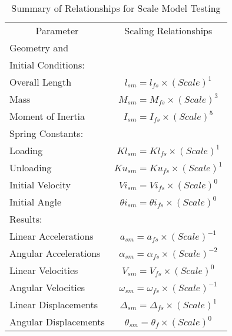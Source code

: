 \begin{table}
\begin{center}
\caption{Summary of Relationships for Scale Model Testing}
\makeqnum
\begin{tabular}{||l|c||}
\hline
\multicolumn{1}{|c}{Parameter}
 &\multicolumn{1}{|c||}{Scaling Relationships}\\
Geometry and & \\
Initial Conditions: &\\
\quad Overall Length     & $l_{sm} = l_{fs} \times (Scale)^{1}$\\
\quad Mass               & $M_{sm} = M_{fs} \times (Scale)^{3}$\\
\quad Moment of Inertia  & $I_{sm} = I_{fs} \times (Scale)^{5}$\\
\quad Spring Constants: &\\
\quad \quad Loading      & $Kl_{sm} = Kl_{fs} \times (Scale)^{1}$\\
\quad \quad Unloading    & $Ku_{sm} = Ku_{fs} \times (Scale)^{1}$\\
\quad Initial Velocity   & $Vi_{sm} = Vi_{fs} \times (Scale)^{0}$\\
\quad Initial Angle      & $\theta i_{sm} = \theta i_{fs} \times
(Scale)^{0}$\\
\hline
Results: & \\
\quad    Linear Accelerations  & $a_{sm} = a_{fs} \times (Scale)^{-1}$\\
\quad    Angular Accelerations & $\alpha _{sm} = \alpha _{fs} \times
(Scale)^{-2}$\\
\quad    Linear Velocities     & $V_{sm} = V_{fs} \times (Scale)^{0}$\\
\quad    Angular Velocities    & $\omega _{sm} = \omega _{fs} \times
(Scale)^{-1}$\\
\quad    Linear Displacements  & $\Delta _{sm} = \Delta _{fs} \times
(Scale)^{1}$\\
\quad    Angular Displacements & $\theta _{sm} = \theta _{f} \times
(Scale)^{0}$\\
\hline
\end{tabular}
\end{center}
\end{table}
